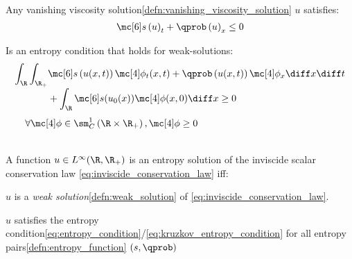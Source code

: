 \begin{defnbox}\nospacing
    \begin{defn}\label{defn:entropy_condition}\leavevmode\\
        Any vanishing viscosity solution\cref{defn:vanishing_viscosity_solution} $u$ satisfies:
        \begin{align}
          \entropy\left(u\right)_{t}+\qprob\left(u\right)_{x}\leq0\label{eq:entropy_condition}
        \end{align}
    \end{defn}
\end{defnbox}
\begin{corbox}\nospacing
    \begin{cor}\label{cor:entropy_condition_for_distributions}
        Is an entropy condition that holds for weak-solutions:
          \begin{align}
            \int_{\R}\int_{\R_{+}}&\entropy \left(u(x,t)\right)\testfunc_{t}(x,t)+\qprob \left(u(x,t)\right)\testfunc_{x}\diff x\diff t\nonumber \\[-1\jot]
            &+\int_{\R}\entropy(u_{0}(x))\testfunc(x,0)\diff x\geq0\label{eq:kruzkov_entropy_condition}
          \end{align}
          \hfill$\qquad\forall\testfunc\in\sm_{C}^{1}\left(\R\times\R_{+}\right),\testfunc\geq0\nonumber$
    \end{cor}
\end{corbox}
\begin{defnbox}\nospacing
    \begin{defn}\label{defn:entropy_solution}\leavevmode\\
        A function $u\in L^{\infty}(\R,\R_{+})$ is an entropy solution of the inviscide scalar conservation law \cref{eq:inviscide_conservation_law} iff:
        \begin{circlelistnosep}
            \item $u$ is a \textit{weak solution}\cref{defn:weak_solution} of \cref{eq:inviscide_conservation_law}.
            \item $u$ satisfies the entropy condition\cref{eq:entropy_condition}/\cref{eq:kruzkov_entropy_condition} for all entropy pairs\cref{defn:entropy_function} $(s,\qprob)$
        \end{circlelistnosep}
    \end{defn}
\end{defnbox}
